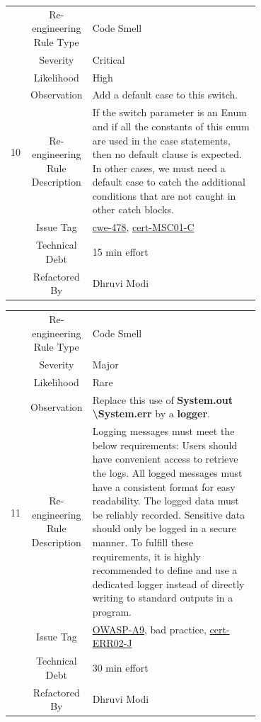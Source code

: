 \documentclass[12pt,letterpaper]{report}
\begin{document}
{\begin{table}
    \begin{tabular}{|c|c|p{0.7\linewidth}|}
    \hline   
    \multirow{8}{*}{10}
        & Re-engineering Rule Type & Code Smell \\
    \cline{2-3}
       & Severity &  Critical \\
    \cline{2-3}
       & Likelihood &  High \\
    \cline{2-3}
       & Observation & Add a default case to this switch. \\
    \cline{2-3}
       & Re-engineering Rule Description &  If the switch parameter is an Enum and if all the constants of this enum are used in the case statements, then no default clause is expected. In other cases, we must need a default case to catch the additional conditions that are not caught in other catch blocks. \\
    \cline{2-3}
       & Issue Tag & \href{https://cwe.mitre.org/data/definitions/478}{cwe-478}, \href{https://wiki.sei.cmu.edu/confluence/display/c/MSC01-C.+Strive+for+logical+completeness}{cert-MSC01-C} \\
    \cline{2-3}
       & Technical Debt & 15 min effort  \\
    \cline{2-3}
       & Refactored By & Dhruvi Modi \\
    \hline
    \end{tabular}
\end{table}

\begin{table}
    \begin{tabular}{|c|c|p{0.7\linewidth}|}
    \hline   
    \multirow{8}{*}{11}
        & Re-engineering Rule Type & Code Smell \\
    \cline{2-3}
       & Severity &  Major \\
    \cline{2-3}
       & Likelihood &  Rare \\
    \cline{2-3}
       & Observation & Replace this use of \textbf{System.out \textbackslash System.err} by a \textbf{logger}. \\
    \cline{2-3}
       & Re-engineering Rule Description & Logging messages must meet the below requirements: Users should have convenient access to retrieve the logs. All logged messages must have a consistent format for easy readability.
The logged data must be reliably recorded. Sensitive data should only be logged in a secure manner. To fulfill these requirements, it is highly recommended to define and use a dedicated logger instead of directly writing to standard outputs in a program.  \\
    \cline{2-3}
       & Issue Tag & \href{https://owasp.org/Top10/A09_2021-Security_Logging_and_Monitoring_Failures/}{OWASP-A9}, bad practice, \href{https://wiki.sei.cmu.edu/confluence/display/java/ERR02-J.+Prevent+exceptions+while+logging+data}{cert-ERR02-J} \\
    \cline{2-3}
       & Technical Debt & 30 min effort  \\
    \cline{2-3}
       & Refactored By & Dhruvi Modi \\
    \hline
    \end{tabular}
\end{table}

}
\end{document}
